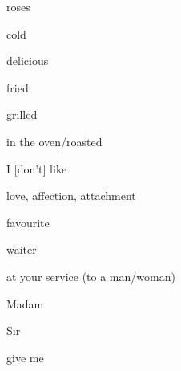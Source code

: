 \documentclass[avery5371,grid,frame]{flashcards}
\begin{document}
\begin{flashcard}{\LARGE roses}
\LARGE {}
\end{flashcard}
\begin{flashcard}{\LARGE cold}
\LARGE {}
\end{flashcard}
\begin{flashcard}{\LARGE delicious}
\LARGE {}
\end{flashcard}
\begin{flashcard}{\LARGE fried}
\LARGE {}
\end{flashcard}
\begin{flashcard}{\LARGE grilled}
\LARGE {}
\end{flashcard}
\begin{flashcard}{\LARGE in the oven/roasted}
\LARGE {}
\end{flashcard}
\begin{flashcard}{\LARGE I {[}don't{]} like}
\LARGE {}
\end{flashcard}
\begin{flashcard}{\LARGE love, affection, attachment}
\LARGE {}
\end{flashcard}
\begin{flashcard}{\LARGE favourite}
\LARGE {}
\end{flashcard}
\begin{flashcard}{\LARGE waiter}
\LARGE {}
\end{flashcard}
\begin{flashcard}{\LARGE at your service (to a man/woman)}
\LARGE {}
\end{flashcard}
\begin{flashcard}{\LARGE Madam}
\LARGE {}
\end{flashcard}
\begin{flashcard}{\LARGE Sir}
\LARGE {}
\end{flashcard}
\begin{flashcard}{\LARGE give me}
\LARGE {}
\end{flashcard}
\end{document}
